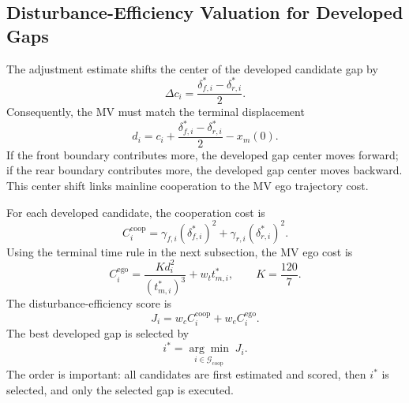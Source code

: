 \documentclass[conference]{IEEEtran}
\begin{document}
\subsection{Disturbance-Efficiency Valuation for Developed Gaps}
The adjustment estimate shifts the center of the developed candidate gap by
\begin{equation}
    \Delta c_i=\frac{\delta_{f,i}^*-\delta_{r,i}^*}{2}.
    \label{eq:center_shift}
\end{equation}
Consequently, the MV must match the terminal displacement
\begin{equation}
    d_i=c_i+\frac{\delta_{f,i}^*-\delta_{r,i}^*}{2}-x_m(0).
    \label{eq:terminal_displacement}
\end{equation}
If the front boundary contributes more, the developed gap center moves forward;
if the rear boundary contributes more, the developed gap center moves backward.
This center shift links mainline cooperation to the MV ego trajectory cost.

For each developed candidate, the cooperation cost is
\begin{equation}
    C_i^{\mathrm{coop}}
    =
    \gamma_{f,i}(\delta_{f,i}^*)^2+
    \gamma_{r,i}(\delta_{r,i}^*)^2.
    \label{eq:coop_cost}
\end{equation}
Using the terminal time rule in the next subsection, the MV ego cost is
\begin{equation}
    C_i^{\mathrm{ego}}
    =
    \frac{K d_i^2}{(t_{m,i}^*)^3}
    +
    w_t t_{m,i}^*,
    \qquad
    K=\frac{120}{7}.
    \label{eq:ego_cost}
\end{equation}
The disturbance-efficiency score is
\begin{equation}
    J_i
    =
    w_c C_i^{\mathrm{coop}}
    +
    w_e C_i^{\mathrm{ego}}.
    \label{eq:valuation}
\end{equation}
The best developed gap is selected by
\begin{equation}
    i^*
    =
    \underset{i\in\mathcal{G}_{\mathrm{coop}}}{\arg\min}\;J_i.
    \label{eq:selected_gap}
\end{equation}
The order is important: all candidates are first estimated and scored, then
\(i^*\) is selected, and only the selected gap is executed.
\end{document}

